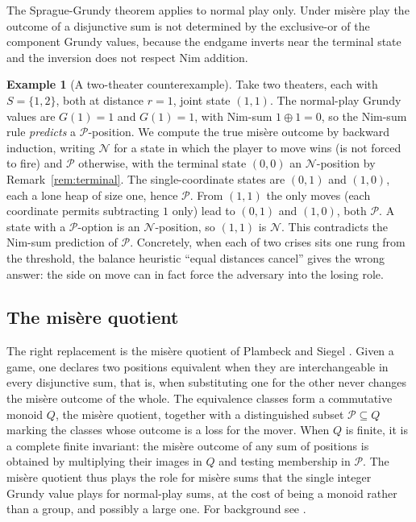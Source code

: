 \documentclass[11pt]{article}
\theoremstyle{plain}
\theoremstyle{definition}
\newtheorem{example}[theorem]{Example}
\theoremstyle{remark}
\begin{document}
The Sprague-Grundy theorem applies to normal play only. Under mis\`ere play
the outcome of a disjunctive sum is not determined by the exclusive-or of the
component Grundy values, because the endgame inverts near the terminal
state and the inversion does not respect Nim addition.

\begin{example}[A two-theater counterexample]\label{ex:counter}
Take two theaters, each with $S=\{1,2\}$, both at distance $r=1$, joint state
$(1,1)$. The normal-play Grundy values are $G(1)=1$ and $G(1)=1$, with
Nim-sum $1\oplus 1=0$, so the Nim-sum rule \emph{predicts} a
$\mathcal{P}$-position. We compute the true mis\`ere outcome by backward
induction, writing $\mathcal{N}$ for a state in which the player to move
wins (is not forced to fire) and $\mathcal{P}$ otherwise, with the terminal
state $(0,0)$ an $\mathcal{N}$-position by Remark~\ref{rem:terminal}. The
single-coordinate states are $(0,1)$ and $(1,0)$, each a lone heap of size
one, hence $\mathcal{P}$. From $(1,1)$ the only moves (each coordinate
permits subtracting $1$ only) lead to $(0,1)$ and $(1,0)$, both
$\mathcal{P}$. A state with a $\mathcal{P}$-option is an
$\mathcal{N}$-position, so $(1,1)$ is $\mathcal{N}$. This contradicts the
Nim-sum prediction of $\mathcal{P}$. Concretely, when each of two crises sits
one rung from the threshold, the balance heuristic ``equal distances cancel''
gives the wrong answer: the side on move can in fact force the adversary into
the losing role.
\end{example}

\subsection{The mis\`ere quotient}

The right replacement is the mis\`ere quotient of Plambeck and Siegel
\citep{plambeck2005, plambecksiegel2008}. Given a game, one declares two
positions equivalent when they are interchangeable in every disjunctive sum,
that is, when substituting one for the other never changes the mis\`ere
outcome of the whole. The equivalence classes form a commutative monoid $Q$,
the mis\`ere quotient, together with a distinguished subset
$\mathcal{P}\subseteq Q$ marking the classes whose outcome is a loss for the
mover. When $Q$ is finite, it is a complete finite invariant: the mis\`ere
outcome of any sum of positions is obtained by multiplying their images in
$Q$ and testing membership in $\mathcal{P}$. The mis\`ere quotient thus plays
the role for mis\`ere sums that the single integer Grundy value plays for
normal-play sums, at the cost of being a monoid rather than a group, and
possibly a large one. For background see \citep{siegel2013}.
\end{document}

